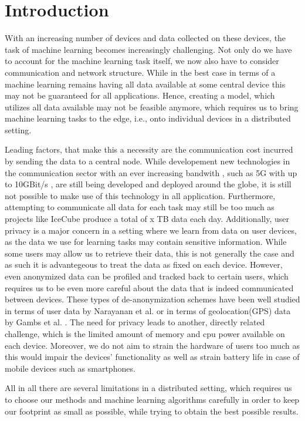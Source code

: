 \chapter{Introduction}
With an increasing number of devices and data collected on these devices, the task of machine learning becomes increasingly challenging.
Not only do we have to account for the machine learning task itself, we now also have to consider communication and network structure.
While in the best case in terms of a machine learning remains having all data available at some central device this may not be guaranteed for all applications.
Hence, creating a model, which utilizes all data available may not be feasible anymore, which requires us to bring machine learning tasks to the edge, i.e., onto individual devices in a distributed setting.

Leading factors, that make this a necessity are the communication cost incurred by sending the data to a central node.
While developement new technologies in the communication sector with an ever increasing bandwith , such as 5G with up to 10GBit/s \cite{nordrum2017ieee}, are still being developed and deployed around the globe, it is still not possible to make use of this technology in all application. 
Furthermore, attempting to communicate all data for each task may still be too much as projects like IceCube produce a total of x TB data each day.
Additionally, user privacy is a major concern in a setting where we learn from data on user devices, as the data we use for learning tasks may contain sensitive information.
While some users may allow us to retrieve their data, this is not generally the case and as such it is advantegeous to treat the data as fixed on each device.   
However, even anonymized data can be profiled and tracked back to certain users, which requires us to be even more careful about the data that is indeed communicated between devices.
These types of de-anonymization schemes have been well studied in terms of user data by Narayanan et al. \cite{narayanan2008robust} or in terms of geolocation(GPS) data by Gambs et al. \cite{gambs2014anonymization}.
The need for privacy leads to another, directly related challenge, which is the limited amount of memory and cpu power available on each device.
Moreover, we do not aim to strain the hardware of users too much as this would impair the devices' functionality as well as strain battery life in case of mobile devices such as smartphones.

All in all there are several limitations in a distributed setting, which requires us to choose our methods and machine learning algorithms carefully in order to keep our footprint as small as possible, while trying to obtain the best possible results.

